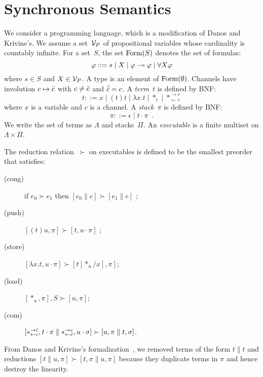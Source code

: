 


\section{Synchronous Semantics}


\newcommand{\conc}{\parallel}
\newcommand{\comod}[2]{\ast^{\rightarrow {#2}}_{\leftarrow{#1}}}
\newcommand{\reader}[1]{\ast_{\leftarrow{#1}}}

We consider a programming language, which is a modification of
Danos and Krivine's.
We assume a set~$\mathcal V_P$ of propositional variables whose cardinality is
countably infinite.
For a set~$S$,
the set $\mathop{\text{Form}}(S)$ denotes the set of formulas:
\[
\varphi::= s \mid X \mid \varphi\multimap\varphi\mid \forall X \varphi
\]
where $s\in S$ and $X\in \mathcal V_P$.
A type is an element of $\mathop{\text{Form}}(\emptyset)$.
Channels have involution $c\mapsto\bar{c}$ with
$c\neq \bar{c}$ and
$\bar{\bar{c}} = c$.
A \textit{term}~$t$ is defined by BNF:
\[
 t::= x
 \mid (t)t
 \mid \lambda x.t
 \mid \ast_t
 \mid \comod c c
\]
where $x$ is a variable and $c$ is a channel.
A \textit{stack}~$\pi$ is defined by BNF:
\[
 \pi ::= \epsilon
 \mid t\cdot \pi
 \enspace.
\]
We write the set of terms as $\Lambda$ and stacks~$\Pi$.
An \textit{executable} is a finite multiset on $\Lambda \times \Pi$.

\newcommand{\red}{\succ}
The reduction relation~$\red$ on executables
is defined to be the smallest preorder
that satisfies:
\begin{description}
 \item[(cong)] if
	    $e_0         \red e_1$
	    then
	    $[e_0 \conc e] \red [ e_1\conc e]$  \enspace;
 \item[(push)]
	    $[(t)u,\pi]      \red [t,u\cdot\pi]$      \enspace;
 \item[(store)]
	    $[\lambda x.t,u\cdot\pi]
	     \red
	     [t[\ast_u/x],      \pi]$\enspace;
 \item[(load)]
	    $[\ast_u,\pi],S\red[u,\pi]$\enspace;
 \item[(com)]
	    $[\comod c{\co c}, t\cdot\pi\conc \comod{\co c}c,
	    u\cdot\sigma] \red
	    [u,\pi\conc t,\sigma]$\enspace.
\end{description}
From Danos and Krivine's formalization~,
we removed terms of the form $ t\conc t $ and
reductions
	    $[t\conc u,\pi]  \red [t,\pi\conc u,\pi]$
because they duplicate terms in $\pi$ and hence destroy the linearity.


